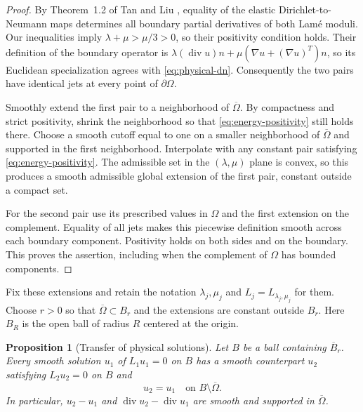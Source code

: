 \documentclass[11pt]{article}
\DeclareMathOperator{\diverg}{div}
\newtheorem{proposition}[theorem]{Proposition}
\theoremstyle{remark}
\numberwithin{equation}{section}
\begin{document}
\begin{proof}
By Theorem~1.2 of Tan and Liu \cite{TanLiu2023}, equality of the elastic
Dirichlet-to-Neumann maps determines all boundary partial derivatives
of both Lam\'e moduli. Our inequalities imply
$\lambda+\mu>\mu/3>0$, so their positivity condition holds.
Their definition of the boundary operator is
$\lambda(\diverg u)n+\mu(\nabla u+(\nabla u)^T)n$, so its Euclidean
specialization agrees with \eqref{eq:physical-dn}.
Consequently the two pairs have identical jets at every point of
$\partial\Omega$.

Smoothly extend the first pair to a neighborhood of
$\overline\Omega$. By compactness and strict positivity, shrink the
neighborhood so that \eqref{eq:energy-positivity} still holds there.
Choose a smooth cutoff equal to one on a smaller neighborhood of
$\overline\Omega$ and supported in the first neighborhood. Interpolate
with any constant pair satisfying \eqref{eq:energy-positivity}.
The admissible set in the $(\lambda,\mu)$ plane is convex, so this
produces a smooth admissible global extension of the first pair, constant
outside a compact set.

For the second pair use its prescribed values in $\Omega$ and the first
extension on the complement. Equality of all jets makes this piecewise
definition smooth across each boundary component. Positivity holds on
both sides and on the boundary. This proves the assertion, including
when the complement of $\Omega$ has bounded components.
\end{proof}

Fix these extensions and retain the notation $\lambda_j,\mu_j$ and
$L_j=L_{\lambda_j,\mu_j}$ for them. Choose $r>0$ so that
$\overline\Omega\subset B_r$ and the extensions are constant outside
$B_r$. Here $B_R$ is the open ball of radius $R$ centered at the origin.

\begin{proposition}[Transfer of physical solutions]\label{prop:physical-transfer}
Let $B$ be a ball containing $\overline B_r$. Every smooth solution
$u_1$ of $L_1u_1=0$ on $B$ has a smooth counterpart $u_2$ satisfying
$L_2u_2=0$ on $B$ and
\[
 u_2=u_1\quad\text{on }B\setminus\overline\Omega.
\]
In particular, $u_2-u_1$ and
$\diverg u_2-\diverg u_1$ are smooth and supported in
$\overline\Omega$.
\end{proposition}
\end{document}

